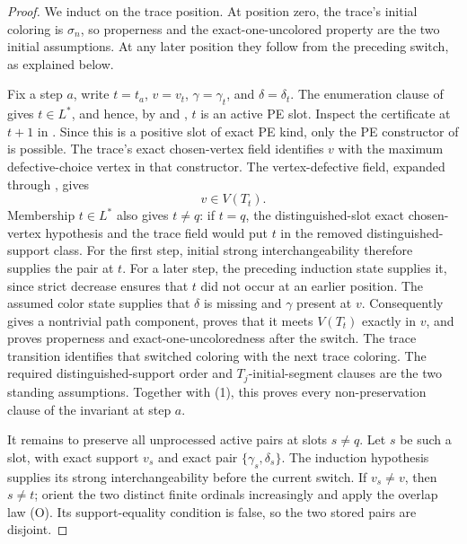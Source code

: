 \begin{proof}
We induct on the trace position. At position zero, the trace's initial
coloring is \(\sigma_n\), so properness and the exact-one-uncolored property
are the two initial assumptions. At any later position they follow from the
preceding switch, as explained below.

Fix a step \(a\), write \(t=t_a\), \(v=v_t\),
\(\gamma=\gamma_t\), and \(\delta=\delta_t\). The enumeration clause of
 gives \(t\in L^*\), and hence, by
 and
, \(t\) is an active PE slot. Inspect the
certificate at \(t+1\) in . Since this is a positive
slot of exact PE kind, only the PE constructor of
 is possible. The trace's exact chosen-vertex
field identifies \(v\) with the maximum defective-choice vertex in that
constructor. The vertex-defective field, expanded through
, gives
\[
                         v\in V(T_t).                \tag{1}
\]
Membership \(t\in L^*\) also gives \(t\ne q\): if \(t=q\), the
distinguished-slot exact chosen-vertex hypothesis and the trace field would
put \(t\) in the removed distinguished-support class. For the first step,
initial strong
interchangeability therefore supplies the pair at \(t\). For a later step,
the preceding induction state supplies it, since strict decrease ensures
that \(t\) did not occur at an earlier position. The assumed color state
supplies that \(\delta\) is missing and \(\gamma\) present at \(v\).
Consequently  gives a nontrivial
path component, proves that it meets \(V(T_t)\) exactly in \(v\), and proves
properness and exact-one-uncoloredness after the switch. The trace transition
identifies that switched coloring with the next trace coloring. The required
distinguished-support order and \(T_j\)-initial-segment clauses are the two
standing assumptions. Together with (1), this proves every non-preservation
clause of the invariant at step \(a\).

It remains to preserve all unprocessed active pairs at slots \(s\ne q\).
Let \(s\) be such a slot, with exact support \(v_s\) and exact pair
\(\{\gamma_s,\delta_s\}\). The induction hypothesis supplies its strong
interchangeability before the current switch. If \(v_s\ne v\), then
\(s\ne t\); orient the two distinct finite ordinals increasingly and apply
the overlap law (O). Its support-equality condition is false, so the two
stored pairs are disjoint.


\end{proof}
